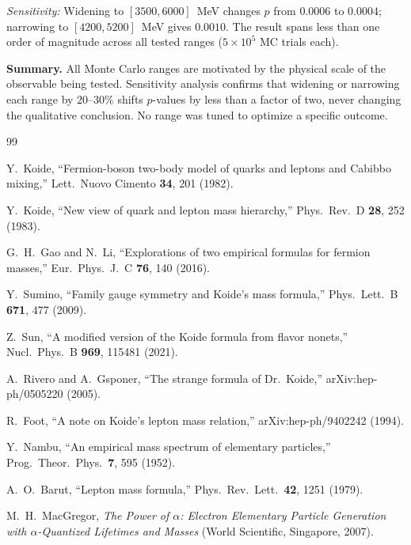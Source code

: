 \documentclass[11pt,a4paper]{article}
\begin{document}
\emph{Sensitivity:} Widening to $[3500, 6000]$~MeV changes $p$ from
$0.0006$ to $0.0004$; narrowing to $[4200, 5200]$~MeV gives $0.0010$.
The result spans less than one order of magnitude across all tested
ranges ($5 \times 10^5$ MC trials each).

\bigskip
\noindent
\textbf{Summary.}
All Monte Carlo ranges are motivated by the physical scale of the
observable being tested. Sensitivity analysis confirms that widening
or narrowing each range by $20$--$30\%$ shifts $p$-values by less than
a factor of two, never changing the qualitative conclusion. No range
was tuned to optimize a specific outcome.

\begin{thebibliography}{99}

  Y.~Koide,
  ``Fermion-boson two-body model of quarks and leptons
  and Cabibbo mixing,''
  Lett.\ Nuovo Cimento \textbf{34}, 201 (1982).

  Y.~Koide,
  ``New view of quark and lepton mass hierarchy,''
  Phys.\ Rev.\ D \textbf{28}, 252 (1983).

  G.~H.~Gao and N.~Li,
  ``Explorations of two empirical formulas for fermion masses,''
  Eur.\ Phys.\ J.\ C \textbf{76}, 140 (2016).

  Y.~Sumino,
  ``Family gauge symmetry and Koide's mass formula,''
  Phys.\ Lett.\ B \textbf{671}, 477 (2009).

  Z.~Sun,
  ``A modified version of the Koide formula from flavor nonets,''
  Nucl.\ Phys.\ B \textbf{969}, 115481 (2021).

  A.~Rivero and A.~Gsponer,
  ``The strange formula of Dr.\ Koide,''
  arXiv:hep-ph/0505220 (2005).

  R.~Foot,
  ``A note on Koide's lepton mass relation,''
  arXiv:hep-ph/9402242 (1994).

  Y.~Nambu,
  ``An empirical mass spectrum of elementary particles,''
  Prog.\ Theor.\ Phys.\ \textbf{7}, 595 (1952).

  A.~O.~Barut,
  ``Lepton mass formula,''
  Phys.\ Rev.\ Lett.\ \textbf{42}, 1251 (1979).

  M.~H.~MacGregor,
  \textit{The Power of $\alpha$: Electron Elementary Particle
  Generation with $\alpha$-Quantized Lifetimes and Masses}
  (World Scientific, Singapore, 2007).


\end{thebibliography}
\end{document}
